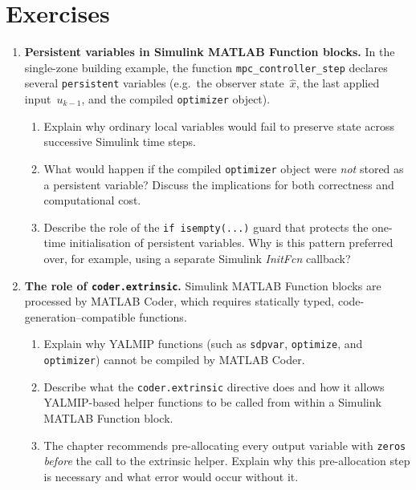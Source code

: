 \section*{Exercises}
\label{sec:simulink_mpc_exercises}

\begin{enumerate}

	\item \textbf{Persistent variables in Simulink MATLAB Function blocks.}
	In the single-zone building example, the function
	\texttt{mpc\_controller\_step} declares several \texttt{persistent}
	variables (e.g.\ the observer state~$\hat x$, the last applied
	input~$u_{k-1}$, and the compiled \texttt{optimizer} object).
	\begin{enumerate}
		\item Explain why ordinary local variables would fail to preserve
		      state across successive Simulink time steps.
		\item What would happen if the compiled \texttt{optimizer} object
		      were \emph{not} stored as a persistent variable?  Discuss the
		      implications for both correctness and computational cost.
		\item Describe the role of the \texttt{if isempty(...)} guard that
		      protects the one-time initialisation of persistent variables.
		      Why is this pattern preferred over, for example, using a
		      separate Simulink \textit{InitFcn} callback?
	\end{enumerate}

	\item \textbf{The role of \texttt{coder.extrinsic}.}
	Simulink MATLAB Function blocks are processed by MATLAB Coder, which
	requires statically typed, code-generation--compatible functions.
	\begin{enumerate}
		\item Explain why YALMIP functions (such as \texttt{sdpvar},
		      \texttt{optimize}, and \texttt{optimizer}) cannot be compiled
		      by MATLAB Coder.
		\item Describe what the \texttt{coder.extrinsic} directive does and
		      how it allows YALMIP-based helper functions to be called from
		      within a Simulink MATLAB Function block.
		\item The chapter recommends pre-allocating every output variable
		      with \texttt{zeros} \emph{before} the call to the extrinsic
		      helper.  Explain why this pre-allocation step is necessary and
		      what error would occur without it.
	\end{enumerate}


\end{enumerate}
